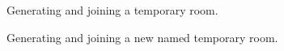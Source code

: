 \begin{figure}
  \centering
  \caption{\label{Figure::temp} Generating and joining a temporary room.}
\end{figure}

\begin{figure}
  \centering
  \caption{\label{Figure::edge} Generating and joining a new named temporary room.}
\end{figure}


